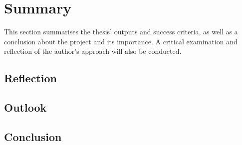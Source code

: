 
\section{Summary}
\label{chapter5-summary}

This section summarises the thesis' outputs and success criteria, as well as a conclusion about the project and its importance. A critical examination and reflection of the author's approach will also be conducted.

\subsection{Reflection}
\label{chapter5-reflection}

\subsection{Outlook}
\label{chapter5-outlook}

\subsection{Conclusion}
\label{chapter5-conclusion}


